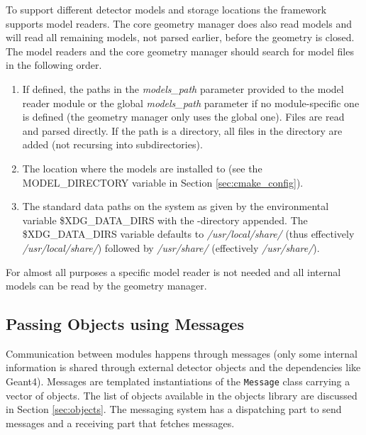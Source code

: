 To support different detector models and storage locations the framework supports model readers. The core geometry manager does also read models and will read all remaining models, not parsed earlier, before the geometry is closed. The model readers and the core geometry manager should search for model files in the following order.
\begin{enumerate}
\item If defined, the paths in the \textit{models\_path} parameter provided to the model reader module or the global \textit{models\_path} parameter if no module-specific one is defined (the geometry manager only uses the global one). Files are read and parsed directly. If the path is a directory, all files in the directory are added (not recursing into subdirectories).
\item The location where the models are installed to (see the MODEL\_DIRECTORY variable in Section \ref{sec:cmake_config}). 
\item The standard data paths on the system as given by the environmental variable \$XDG\_DATA\_DIRS with the \project-directory appended. The \$XDG\_DATA\_DIRS variable defaults to \textit{/usr/local/share/} (thus effectively \textit{/usr/local/share/\project}) followed by \textit{/usr/share/} (effectively \textit{/usr/share/\project}).
\end{enumerate}
For almost all purposes a specific model reader is not needed and all internal models can be read by the geometry manager.


\subsection{Passing Objects using Messages}
\label{sec:objects_messages}
Communication between modules happens through messages (only some internal information is shared through external detector objects and the dependencies like Geant4). Messages are templated instantiations of the \texttt{Message} class carrying a vector of objects. The list of objects available in the \apsq objects library are discussed in Section \ref{sec:objects}. The messaging system has a dispatching part to send messages and a receiving part that fetches messages. 

